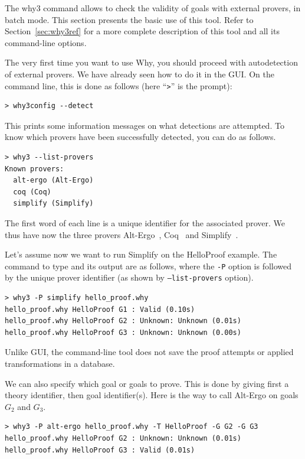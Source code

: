 The why3 command allows to check the validity of goals with external
provers, in batch mode. This section presents the basic use of this
tool. Refer to Section~\ref{sec:why3ref} for a more complete
description of this tool and all its command-line options.

The very first time you want to use Why, you should proceed with
autodetection of external provers. We have already seen how to do
it in the \why GUI. On the command line, this is done as follows
(here ``\texttt{>}'' is the prompt):
\begin{verbatim}
> why3config --detect
\end{verbatim}
This prints some information messages on what detections are attempted. To know which
provers have been successfully detected, you can do as follows.
\begin{verbatim}
> why3 --list-provers
Known provers:
  alt-ergo (Alt-Ergo)
  coq (Coq)
  simplify (Simplify)
\end{verbatim}
The first word of each line is a unique identifier for the associated prover. We thus
have now the three provers Alt-Ergo~\cite{ergo}, Coq~\cite{CoqArt} and
Simplify~\cite{simplify05}.

Let's assume now we want to run Simplify on the HelloProof
example. The command to type and its output are as follows, where the
\verb|-P| option is followed by the unique prover identifier (as shown
by \texttt{--list-provers} option).
\begin{verbatim}
> why3 -P simplify hello_proof.why
hello_proof.why HelloProof G1 : Valid (0.10s)
hello_proof.why HelloProof G2 : Unknown: Unknown (0.01s)
hello_proof.why HelloProof G3 : Unknown: Unknown (0.00s)
\end{verbatim}
Unlike \why GUI, the command-line tool does not save the proof attempts
or applied transformations in a database.

We can also specify which goal or goals to prove. This is done by giving
first a theory identifier, then goal identifier(s). Here is the way to
call Alt-Ergo on goals $G_2$ and $G_3$.
\begin{verbatim}
> why3 -P alt-ergo hello_proof.why -T HelloProof -G G2 -G G3
hello_proof.why HelloProof G2 : Unknown: Unknown (0.01s)
hello_proof.why HelloProof G3 : Valid (0.01s)
\end{verbatim}

